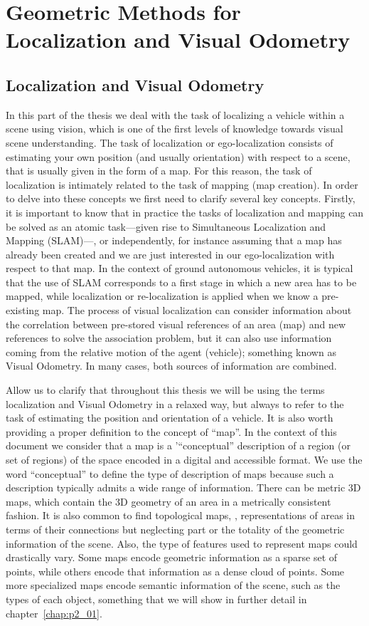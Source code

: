 \chapter{Geometric Methods for Localization and Visual Odometry}
\label{chap:p1_00}
\vspace{-8mm}
\section{Localization and Visual Odometry}

In this part of the thesis we deal with the task of localizing a vehicle within a scene using vision, which is one of the first levels of knowledge towards visual scene understanding. The task of localization or ego-localization consists of estimating your own position (and usually orientation) with respect to a scene, that is usually given in the form of a map. For this reason, the task of localization is intimately related to the task of mapping (map creation). In order to delve into these concepts we first need to clarify several key concepts. Firstly, it is important to know that in practice the tasks of localization and mapping can be solved as an atomic task---given rise to Simultaneous Localization and Mapping (SLAM)---, or independently, for instance assuming that a map has already been created and we are just interested in our ego-localization with respect to that map. In the context of ground autonomous vehicles, it is typical that the use of SLAM corresponds to a first stage in which a new area has to be mapped, while localization or re-localization is applied when we know a pre-existing map. The process of visual localization can consider information about the correlation between pre-stored visual references of an area (map) and new references to solve the association problem, but it can also use information coming from the relative motion of the agent (vehicle); something known as Visual Odometry. In many cases, both sources of information are combined.

Allow us to clarify that throughout this thesis we will be using the terms localization and Visual Odometry in a relaxed way, but always to refer to the task of estimating the position and orientation of a vehicle. It is also worth providing a proper definition to the concept of ``map''. In the context of this document we consider that a map is a '``conceptual'' description of a region (or set of regions) of the space encoded in a digital and accessible format. We use the word ``conceptual'' to define the type of description of maps because such a description typically admits a wide range of information. There can be metric 3D maps, which contain the 3D geometry of an area in a metrically consistent fashion. It is also common to find topological maps, \ie, representations of areas in terms of their connections but neglecting part or the totality of the geometric information of the scene. Also, the type of features used to represent maps could drastically vary. Some maps encode geometric information as a sparse set of points, while others encode that information as a dense cloud of points. Some more specialized maps encode semantic information of the scene, such as the types of each object, something that we will show in further detail in chapter~\ref{chap:p2_01}.

